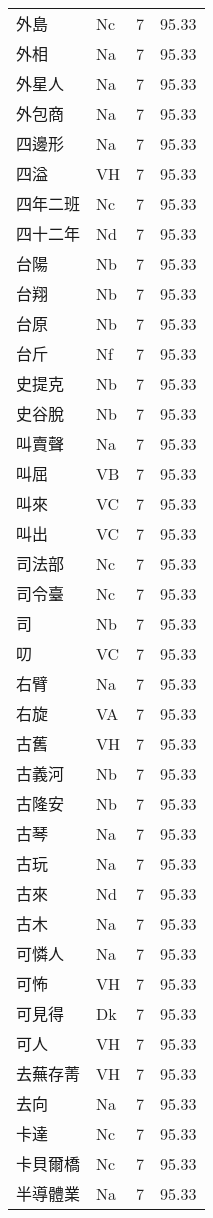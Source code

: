 \documentclass[twocolumn]{book}
\begin{document}
\begin{supertabular}{llrr}
外島 & Nc & 7 &  95.33\\
外相 & Na & 7 &  95.33\\
外星人 & Na & 7 &  95.33\\
外包商 & Na & 7 &  95.33\\
四邊形 & Na & 7 &  95.33\\
四溢 & VH & 7 &  95.33\\
四年二班 & Nc & 7 &  95.33\\
四十二年 & Nd & 7 &  95.33\\
台陽 & Nb & 7 &  95.33\\
台翔 & Nb & 7 &  95.33\\
台原 & Nb & 7 &  95.33\\
台斤 & Nf & 7 &  95.33\\
史提克 & Nb & 7 &  95.33\\
史谷脫 & Nb & 7 &  95.33\\
叫賣聲 & Na & 7 &  95.33\\
叫屈 & VB & 7 &  95.33\\
叫來 & VC & 7 &  95.33\\
叫出 & VC & 7 &  95.33\\
司法部 & Nc & 7 &  95.33\\
司令臺 & Nc & 7 &  95.33\\
司 & Nb & 7 &  95.33\\
叨 & VC & 7 &  95.33\\
右臂 & Na & 7 &  95.33\\
右旋 & VA & 7 &  95.33\\
古舊 & VH & 7 &  95.33\\
古義河 & Nb & 7 &  95.33\\
古隆安 & Nb & 7 &  95.33\\
古琴 & Na & 7 &  95.33\\
古玩 & Na & 7 &  95.33\\
古來 & Nd & 7 &  95.33\\
古木 & Na & 7 &  95.33\\
可憐人 & Na & 7 &  95.33\\
可怖 & VH & 7 &  95.33\\
可見得 & Dk & 7 &  95.33\\
可人 & VH & 7 &  95.33\\
去蕪存菁 & VH & 7 &  95.33\\
去向 & Na & 7 &  95.33\\
卡達 & Nc & 7 &  95.33\\
卡貝爾橋 & Nc & 7 &  95.33\\
半導體業 & Na & 7 &  95.33\\

\end{supertabular}
\end{document}
